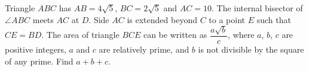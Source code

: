 Triangle $ABC$ has $AB=4\sqrt5$, $BC=2\sqrt5$ and $AC=10$. The internal bisector of $\angle ABC$ meets $AC$ at $D$. Side $AC$ is extended beyond $C$ to a point $E$ such that $CE=BD$. The area of triangle $BCE$ can be written as $\dfrac{a\sqrt b}{c}$, where $a$, $b$, $c$ are positive integers, $a$ and $c$ are relatively prime, and $b$ is not divisible by the square of any prime. Find $a+b+c$.

